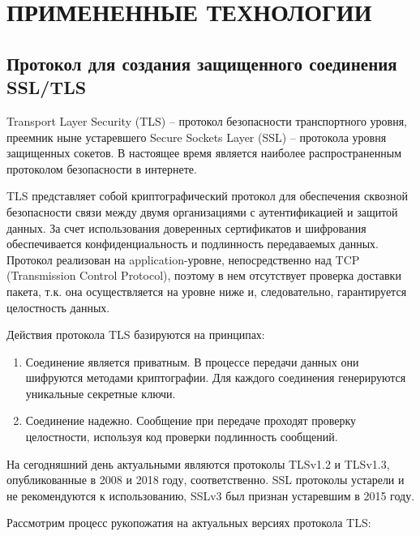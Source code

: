 \section{ПРИМЕНЕННЫЕ ТЕХНОЛОГИИ}

\subsection{Протокол для создания защищенного соединения SSL/TLS}
Transport Layer Security (TLS) -- протокол безопасности транспортного уровня, преемник ныне устаревшего Secure Sockets Layer (SSL)  -- протокола уровня защищенных сокетов. В настоящее время является наиболее распространенным протоколом безопасности в интернете.

TLS представляет собой криптографический протокол для обеспечения сквозной безопасности связи между двумя организациями с аутентификацией и защитой данных. За счет использования доверенных сертификатов и шифрования обеспечивается конфиденциальность и подлинность передаваемых данных. Протокол реализован на application-уровне, непосредственно над TCP (Transmission Control Protocol), поэтому в нем отсутствует проверка доставки пакета, т.к. она осуществляется на уровне ниже и, следовательно, гарантируется целостность данных.

Действия протокола TLS базируются на принципах:
\begin{enumerate}
	\item Соединение является приватным. В процессе передачи данных они шифруются методами криптографии. Для каждого соединения генерируются уникальные секретные ключи.
	\item Соединение надежно. Сообщение при передаче проходят проверку целостности, используя код проверки подлинность сообщений.
\end{enumerate}

На сегодняшний день актуальными являются протоколы TLSv1.2 и TLSv1.3, опубликованные в 2008 и 2018 году, соответственно. SSL протоколы устарели и не рекомендуются к использованию, SSLv3 был признан устаревшим в 2015 году.
                                                                      
Рассмотрим процесс рукопожатия на актуальных версиях протокола TLS:

